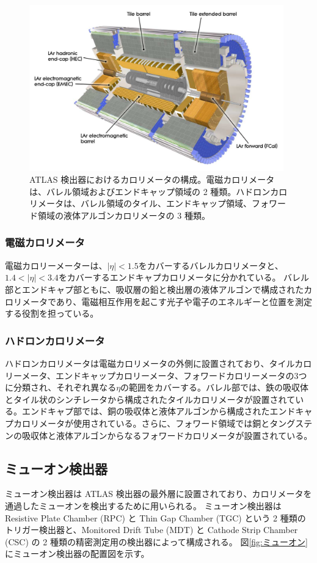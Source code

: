 \begin{figure}[tb]
  \centering
  \includegraphics[clip, width=11cm]{fig/2/Calorimeter_d3.pdf}
  \caption{ATLAS 検出器におけるカロリメータの構成。電磁カロリメータは、バレル領域およびエンドキャップ領域の 2 種類。ハドロンカロリメータは、バレル領域のタイル、エンドキャップ領域、フォワード領域の液体アルゴンカロリメータの 3 種類。}
  \label{fig:カロリメータ}
\end{figure}

\subsubsection{電磁カロリメータ}
電磁カロリーメーターは、$|\eta|<1.5$をカバーするバレルカロリメータと、$1.4<|\eta|<3.4$をカバーするエンドキャプカロリメータに分かれている。
バレル部とエンドキャプ部ともに、吸収層の鉛と検出層の液体アルゴンで構成されたカロリメータであり、電磁相互作用を起こす光子や電子のエネルギーと位置を測定する役割を担っている。

\subsubsection{ハドロンカロリメータ}
ハドロンカロリメータは電磁カロリメータの外側に設置されており、タイルカロリーメータ、エンドキャップカロリーメータ、フォワードカロリーメータの3つに分類され、それぞれ異なる$\eta$の範囲をカバーする。バレル部では、鉄の吸収体とタイル状のシンチレータから構成されたタイルカロリメータが設置されている。エンドキャプ部では、銅の吸収体と液体アルゴンから構成されたエンドキャプカロリメータが使用されている。さらに、フォワード領域では銅とタングステンの吸収体と液体アルゴンからなるフォワードカロリメータが設置されている。

\subsection{ミューオン検出器}\label{section2-2-4}
ミューオン検出器は ATLAS 検出器の最外層に設置されており、カロリメータを通過したミューオンを検出するために用いられる。
ミューオン検出器は Resistive Plate Chamber (RPC) と Thin Gap Chamber (TGC) という 2 種類のトリガー検出器と、Monitored Drift Tube (MDT) と Cathode Strip Chamber (CSC) の 2 種類の精密測定用の検出器によって構成される。
図\ref{fig:ミューオン} にミューオン検出器の配置図を示す。

